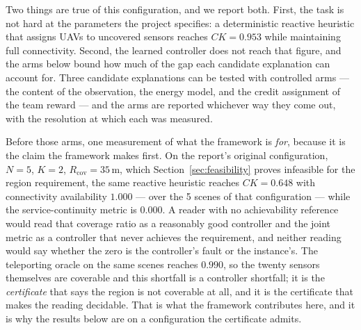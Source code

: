 \documentclass[conference]{IEEEtran}
\begin{document}
Two things are true of this configuration, and we report both.  First, the
task is not hard at the parameters the project specifies: a deterministic
reactive heuristic that assigns UAVs to uncovered sensors reaches
$CK=0.953$ while maintaining full connectivity.  Second, the learned
controller does not reach that figure, and the arms below bound how much
of the gap each candidate explanation can account for.  Three candidate
explanations can be tested with controlled arms --- the content of the
observation, the energy model, and the credit assignment of the team
reward --- and the arms are reported whichever way they come out, with
the resolution at which each was measured.

Before those arms, one measurement of what the framework is \emph{for},
because it is the claim the framework makes first.  On the report's
original configuration, $N=5$, $K=2$, $R_{\mathrm{cov}}=35$\,m, which
Section~\ref{sec:feasibility} proves infeasible for the region
requirement, the same reactive heuristic reaches $CK=0.648$ with
connectivity availability $1.000$ --- over the 5 scenes of
that configuration --- while the service-continuity metric is $0.000$.
A reader with no achievability reference would read that coverage ratio as
a reasonably good controller and the joint metric as a controller that
never achieves the requirement, and neither reading would say whether the
zero is the controller's fault or the instance's.  The teleporting oracle
on the same scenes reaches $0.990$, so the twenty sensors
themselves are coverable and this shortfall is a controller shortfall; it
is the \emph{certificate} that says the region is not coverable at all, and
it is the certificate that makes the reading decidable.  That is what the
framework contributes here, and it is why the results below are on a
configuration the certificate admits.
\end{document}
